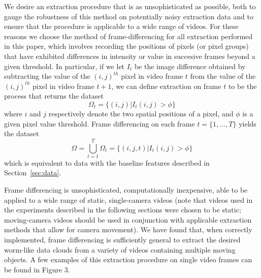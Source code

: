 \documentclass{article}
\begin{document}
We desire an extraction procedure that is as unsophisticated as possible, both to gauge the robustness of this method on potentially noisy extraction data and to ensure that the procedure is applicable to a wide range of videos. For these reasons we choose the method of frame-differencing for all extraction performed in this paper, which involves recording the positions of pixels (or pixel groups) that have exhibited differences in intensity or value in succesive frames beyond a given threshold. In particular, if we let $I_{t}$ be the image difference obtained by subtracting the value of the $(i,j)^{th}$ pixel in video frame $t$ from the value of the $(i,j)^{th}$ pixel in video frame $t+1$, we can define extraction on frame $t$ to be the process that returns the dataset
\begin{equation}
	\Omega_{t} = \{ (i,j) | I_{t}(i,j) > \phi \}
\end{equation}
where $i$ and $j$ respectively denote the two spatial positions of a pixel, and $\phi$ is a given pixel value threshold. Frame differencing on each frame $t =\{1, \ldots, T \}$ yields the dataset
\begin{equation}
	\Omega = \bigcup_{t=1}^{T} \Omega_{t} = \{ (i,j,t) | I_{t}(i,j) > \phi \}
\end{equation}
which is equivalent to data with the baseline features described in Section~\ref{sec:data}.

Frame differencing is unsophisticated, computationally inexpensive, able to be applied to a wide range of static, single-camera videos (note that videos used in the experiments described in the following sections were chosen to be static; moving-camera videos should be used in conjunction with applicable extraction methods that allow for camera movement). We have found that, when correctly implemented, frame differencing is sufficiently general to extract the desired worm-like data clouds from a variety of videos containing multiple moving objects. A few examples of this extraction procedure on single video frames can be found in Figure 3.
\end{document}
